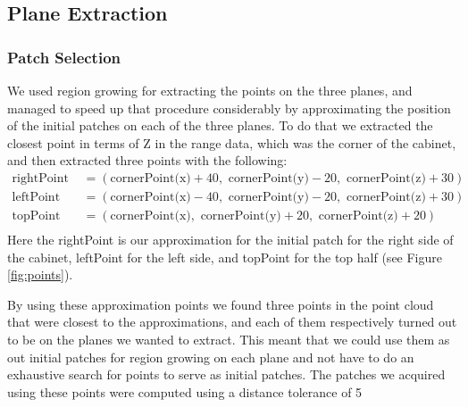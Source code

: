 \subsection{Plane Extraction}
\subsubsection{Patch Selection}
We used region growing for extracting the points on the three planes, and managed to speed up that procedure considerably by approximating the position of the initial patches on each of the three planes. To do that we extracted the closest point in terms of Z in the range data, which was the corner of the cabinet, and then extracted three points with the following:
\begin{equation*}
	\begin{split}
	\text{rightPoint } &= (\text{cornerPoint(x)} + 40, \text{ cornerPoint(y)} - 20, \text{ cornerPoint(z)} + 30) \\
	\text{leftPoint } &= (\text{cornerPoint(x)} - 40, \text{ cornerPoint(y)} - 20, \text{ cornerPoint(z)} + 30) \\
	\text{topPoint } &= (\text{cornerPoint(x)}, \text{ cornerPoint(y)} + 20, \text{ cornerPoint(z)} + 20) \\
	\end{split}
\end{equation*}
Here the rightPoint is our approximation for the initial patch for the right side of the cabinet, leftPoint for the left side, and topPoint for the top half (see Figure \ref{fig:points}). 

By using these approximation points we found three points in the point cloud that were closest to the approximations, and each of them respectively turned out to be on the planes we wanted to extract. This meant that we could use them as out initial patches for region growing on each plane and not have to do an exhaustive search for points to serve as initial patches. The patches we acquired using these points were computed using a distance tolerance of 5

